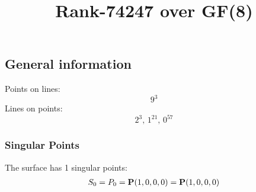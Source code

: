 \documentclass{article}
\newcommand\setTBstruts{\def\T{\rule{0pt}{2.6ex}}%
\def\B{\rule[-1.2ex]{0pt}{0pt}}}
\newcommand{\bP}{{\bf P}}
\begin{document}
 
\setTBstruts



{\allowdisplaybreaks%






\title{Rank-74247 over GF(8)}
\author{}%
\maketitle%
%
{}



\subsection*{General information}
Points on lines:
$$
9^3$$
Lines on points:
$$
2^3,\,1^{21},\,0^{57}$$
\subsubsection*{Singular Points}
The surface has 1 singular points:\\
\begin{align*}
S_{0} &= P_{0}=\bP(1, 0, 0, 0) = \bP(1, 0, 0, 0)\\
\end{align*}
}
\end{document}
